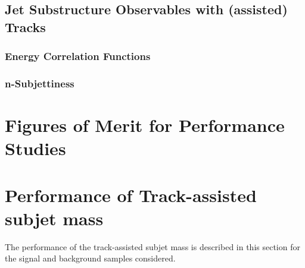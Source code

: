 \documentclass[UKenglish,texlive=2013]{\ATLASLATEXPATH atlasdoc}
\begin{document}










\subsection{Jet Substructure Observables with (assisted) Tracks}\label{sec:tas_jss}



\subsubsection{Energy Correlation Functions}\label{subsec:ECF}


\subsubsection{n-Subjettiness}\label{subsec:nSub}


\clearpage
\section{Figures of Merit for Performance Studies}\label{sec:FoM}


\clearpage
\section{Performance of Track-assisted subjet mass}
\label{sec:mtas}
The performance of the track-assisted subjet mass is described in this section for the signal and background samples considered.

\clearpage
\end{document}
